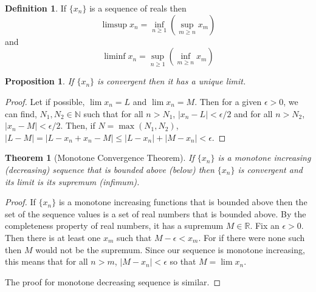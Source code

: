 \documentclass{article}
\theoremstyle{plain}
\newtheorem{thm}{Theorem}
\numberwithin{thm}{section}
\theoremstyle{plain}
\newtheorem{prop}{Proposition}
\numberwithin{prop}{section}
\theoremstyle{definition}
\newtheorem{defn}{Definition}
\numberwithin{defn}{section}
\theoremstyle{remark}
\numberwithin{equation}{section}
\begin{document}
\begin{defn}\label{s1d9}
If $\{x_n\}$ is a sequence of reals then
\[
\limsup x_n = \inf_{n \ge 1}(\sup_{m \ge n} x_m)
\]
and
\[
\liminf x_n = \sup_{n \ge 1}(\inf_{m \ge n} x_m)
\]
\end{defn}

\begin{prop}\label{s1p1}
If $\{x_n\}$ is convergent then it has a unique limit.
\end{prop}
\begin{proof}
Let if possible, $\lim x_n = L$ and $\lim x_n = M$. Then for a given $\epsilon
> 0$, we can find, $N_1, N_2 \in \mathbb{N}$ such that for all $n > N_1$, 
$|x_n - L| < \epsilon/2$ and for all $n > N_2$, $|x_n - M| < \epsilon/2$. Then, 
if $N = \max(N_1, N_2)$, $|L - M| = |L - x_n + x_n - M| \le |L - x_n| + 
|M - x_n| < \epsilon$.
\end{proof}

\begin{thm}[Monotone Convergence Theorem]\label{s1t1}
If $\{x_n\}$ is a monotone increasing (decreasing) sequence that is bounded
above (below) then $\{x_n\}$ is convergent and its limit is its supremum 
(infimum).
\end{thm}
\begin{proof}
If $\{x_n\}$ is a monotone increasing functions that is bounded above then the
set of the sequence values is a set of real numbers that is bounded above. By 
the completeness property of real numbers, it has a supremum $M \in \mathbb{R}$.
Fix an $\epsilon > 0$. Then there is at least one $x_m$ such that $M - \epsilon
< x_m$. For if there were none such then $M$ would not be the supremum. Since
our sequence is monotone increasing, this means that for all $n > m$, $|M - x_n|
< \epsilon$ so that $M = \lim x_n$.

The proof for monotone decreasing sequence is similar.
\end{proof}
\end{document}
